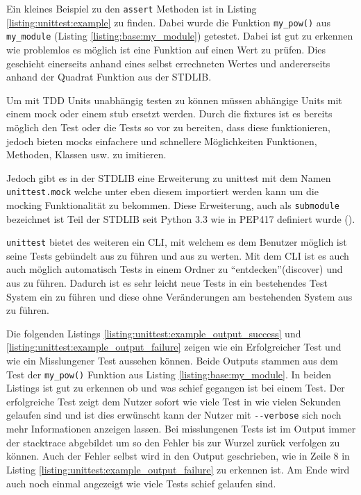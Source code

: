 Ein kleines Beispiel zu den \lstinline{assert} Methoden ist in Listing
\ref{listing:unittest:example} zu finden. Dabei wurde die Funktion
\lstinline{my_pow()} aus \lstinline{my_module} (Listing
\ref{listing:base:my_module}) getestet. Dabei ist gut zu erkennen wie problemlos
es möglich ist eine Funktion auf einen Wert zu prüfen. Dies geschieht
einerseits anhand eines selbst errechneten Wertes und andererseits anhand der
Quadrat Funktion aus der STDLIB.

Um mit TDD Units unabhängig testen zu können müssen abhängige Units mit einem
\Gls{mock} oder einem \Gls{stub} ersetzt werden. Durch die \Glspl{fixture} ist
es bereits möglich den Test oder die Tests so vor zu
bereiten, dass diese funktionieren, jedoch bieten \Glspl{mock} einfachere und
schnellere Möglichkeiten Funktionen, Methoden, Klassen usw. zu imitieren.

Jedoch gibt es in der STDLIB eine Erweiterung zu unittest mit dem Namen
\lstinline{unittest.mock} welche unter eben diesem importiert werden kann um die
\gls{mock}ing Funktionalität zu bekommen. Diese Erweiterung, auch als
\lstinline{submodule} bezeichnet ist Teil der STDLIB seit Python 3.3 wie in
PEP417 definiert wurde (\cite{python.org:PEP417}).

\lstinline{unittest} bietet des weiteren ein CLI, mit welchem es dem Benutzer möglich ist
seine Tests gebündelt aus zu führen und aus zu werten. Mit dem CLI ist es auch
auch möglich automatisch Tests in einem Ordner zu "`entdecken"'(discover) und
aus zu führen. Dadurch ist es sehr leicht neue Tests in ein bestehendes Test
System ein zu führen und diese ohne Veränderungen am bestehenden System aus zu
führen.

Die folgenden Listings \ref{listing:unittest:example_output_success} und
\ref{listing:unittest:example_output_failure} zeigen wie ein Erfolgreicher Test
und wie ein Misslungener Test aussehen können. Beide Outputs stammen aus dem Test
der \lstinline{my_pow()} Funktion aus Listing \ref{listing:base:my_module}.
In beiden Listings ist gut zu erkennen ob und was schief gegangen ist bei einem Test.
Der erfolgreiche Test zeigt dem Nutzer sofort wie viele Test in wie vielen Sekunden gelaufen
sind und ist dies erwünscht kann der Nutzer mit \lstinline|--verbose| sich noch mehr
Informationen anzeigen lassen.
Bei misslungenen Tests ist im Output immer der \gls{stacktrace} abgebildet um so den Fehler
bis zur Wurzel zurück verfolgen zu können. Auch der Fehler selbst wird in den Output geschrieben,
wie in Zeile 8 in Listing \ref{listing:unittest:example_output_failure} zu erkennen ist. Am
Ende wird auch noch einmal angezeigt wie viele Tests schief gelaufen sind.

